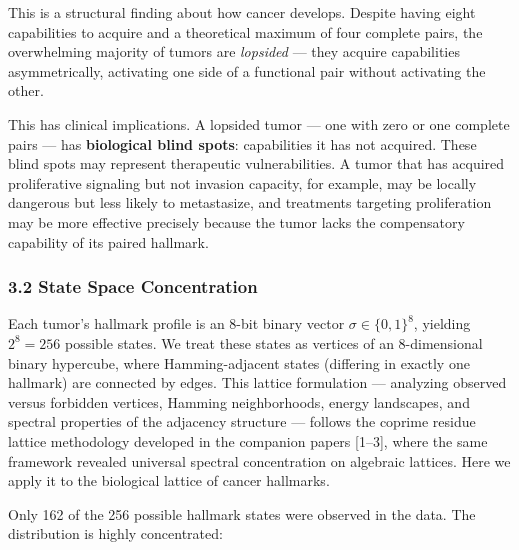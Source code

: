 \documentclass[
  11pt,
]{article}
\begin{document}
This is a structural finding about how cancer develops. Despite having
eight capabilities to acquire and a theoretical maximum of four complete
pairs, the overwhelming majority of tumors are \emph{lopsided} --- they
acquire capabilities asymmetrically, activating one side of a functional
pair without activating the other.

This has clinical implications. A lopsided tumor --- one with zero or
one complete pairs --- has \textbf{biological blind spots}: capabilities
it has not acquired. These blind spots may represent therapeutic
vulnerabilities. A tumor that has acquired proliferative signaling but
not invasion capacity, for example, may be locally dangerous but less
likely to metastasize, and treatments targeting proliferation may be
more effective precisely because the tumor lacks the compensatory
capability of its paired hallmark.

\subsubsection{3.2 State Space
Concentration}\label{state-space-concentration}

Each tumor's hallmark profile is an 8-bit binary vector
\(\sigma \in \{0,1\}^8\), yielding \(2^8 = 256\) possible states. We
treat these states as vertices of an 8-dimensional binary hypercube,
where Hamming-adjacent states (differing in exactly one hallmark) are
connected by edges. This lattice formulation --- analyzing observed
versus forbidden vertices, Hamming neighborhoods, energy landscapes, and
spectral properties of the adjacency structure --- follows the coprime
residue lattice methodology developed in the companion papers
{[}1--3{]}, where the same framework revealed universal spectral
concentration on algebraic lattices. Here we apply it to the biological
lattice of cancer hallmarks.

Only 162 of the 256 possible hallmark states were observed in the data.
The distribution is highly concentrated:
\end{document}
